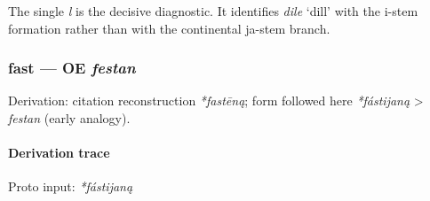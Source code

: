 \documentclass[
  british,
  a4paper,
]{article}
\begin{document}
The single \emph{l} is the decisive diagnostic. It identifies
{\emph{dile}} `dill' with the i-stem formation rather than with the
continental ja-stem branch.

\subsubsection{\texorpdfstring{fast --- OE
\emph{festan}}{fast --- OE festan}}\label{fast-oe-festan}

Derivation: citation reconstruction \emph{*fastēną}; form followed here
\emph{*fástijaną} \textgreater{} \emph{festan} (early analogy).

\paragraph{Derivation trace}\label{derivation-trace-116}

Proto input: \emph{*fástijaną}

\begingroup
\setlength{\fboxsep}{6pt}
\end{document}

